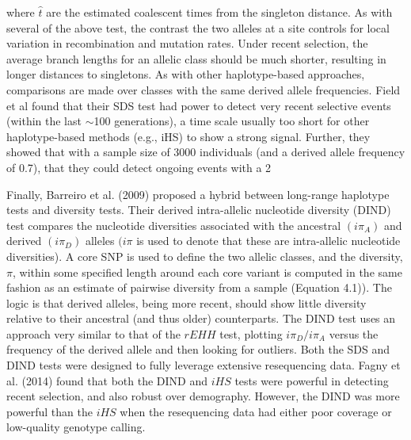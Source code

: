 \documentclass{article}
\begin{document}
where  $ \hat{t} $ are the estimated coalescent times from the singleton distance. As with several of the above test, the contrast the two alleles at a site controls for local variation in recombination and mutation rates. Under recent selection, the average branch lengths for an allelic class should be much shorter, resulting in longer distances to singletons. As with other haplotype-based approaches, comparisons are made over classes with the same derived allele frequencies. Field et al found that their SDS test had power to detect very recent selective events (within the last  $ \sim $100 generations), a time scale usually too short for other haplotype-based methods (e.g., iHS) to show a strong signal. Further, they showed that with a sample size of 3000 individuals (and a derived allele frequency of 0.7), that they could detect ongoing events with a 2%

Finally, Barreiro et al. (2009) proposed a hybrid between long-range haplotype tests and diversity tests. Their derived intra-allelic nucleotide diversity (DIND) test compares the nucleotide diversities associated with the ancestral  $ (i\pi_A) $ and derived  $ (i\pi_D) $ alleles  $ (i\pi $ is used to denote that these are intra-allelic nucleotide diversities). A core SNP is used to define the two allelic classes, and the diversity,  $ \pi $, within some specified length around each core variant is computed in the same fashion as an estimate of pairwise diversity from a sample (Equation 4.1)). The logic is that derived alleles, being more recent, should show little diversity relative to their ancestral (and thus older) counterparts. The DIND test uses an approach very similar to that of the  $ rEHH $ test, plotting  $ i\pi_D/i\pi_A $ versus the frequency of the derived allele and then looking for outliers. Both the SDS and DIND tests were designed to fully leverage extensive resequencing data. Fagny et al. (2014) found that both the DIND and  $ iHS $ tests were powerful in detecting recent selection, and also robust over demography. However, the DIND was more powerful than the  $ iHS $ when the resequencing data had either poor coverage or low-quality genotype calling.
\end{document}
